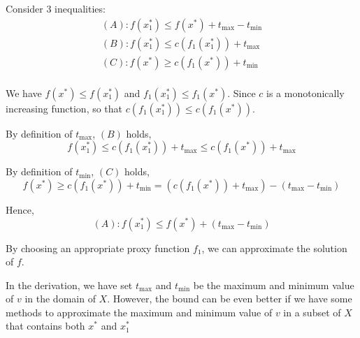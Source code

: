 \documentclass{article}
\begin{document}
Consider 3 inequalities:
\begin{gather*}
    (A): f(x^*_1) \leq f(x^*) + t_{\max} - t_{\min}\\
    (B): f(x^*_1) \leq c(f_1(x^*_1)) + t_{\max}\\
    (C): f(x^*) \geq c(f_1(x^*)) + t_{\min}\\
\end{gather*}

We have $f(x^*) \leq f(x^*_1)$ and $f_1(x^*_1) \leq f_1(x^*)$.
Since $c$ is a monotonically increasing function, so that $c(f_1(x^*_1)) \leq c(f_1(x^*))$.


By definition of $t_{\max}$, $(B)$ holds,
\[
    f(x^*_1) \leq c(f_1(x^*_1)) + t_{\max} \leq c(f_1(x^*)) + t_{\max}
\]

By definition of $t_{\min}$, $(C)$ holds,
\[
    f(x^*) \geq c(f_1(x^*)) + t_{\min} = (c(f_1(x^*)) + t_{\max}) - (t_{\max} - t_{\min})
\]

Hence,
\[
    (A): f(x^*_1) \leq f(x^*) + (t_{\max} - t_{\min})
\]

By choosing an appropriate proxy function $f_1$, we can approximate the solution of $f$.

In the derivation, we have set $t_{\max}$ and $t_{\min}$ be the maximum and minimum value of $v$ in the domain of $X$.
However, the bound can be even better if we have some methods to approximate the maximum and minimum value of $v$ in a subset of $X$ that contains both $x^*$ and $x^*_1$

\end{document}

